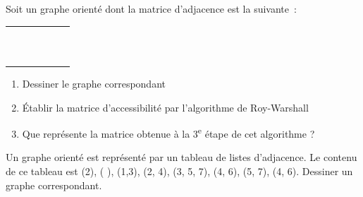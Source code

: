 	\begin{Exercice}{}
		Soit un graphe orienté dont la matrice d'adjacence est la suivante~:
				
		\begin{center}
			\tablefirsthead{}
			\tablehead{}
			\tabletail{}
			\tablelasttail{}
			\begin{supertabular}{m{0.93900007cm}|m{0.81600004cm}|m{0.81600004cm}|m{0.81600004cm}|m{0.81600004cm}|m{0.81600004cm}|}
			 &
			 &
			 &
			 &
			 &
			\\\hhline{~-----}
			 &
			 &
			 &
			 &
			 &
			\centering{}\\\hhline{~-----}
			 &
			 &
			 &
			 &
			 &
			\centering{}\\\hhline{~-----}
			 &
			 &
			 &
			 &
			 &
			\centering{}\\\hhline{~-----}
			 &
			 &
			 &
			 &
			 &
			\centering{}\\\hhline{~-----}
			 &
			 &
			 &
			 &
			 &
			\centering{}\\\hhline{~-----}
			\end{supertabular}
		\end{center}
		
		\begin{enumerate}
			\item {
				Dessiner le graphe correspondant}
			\item {
				Établir la matrice d'accessibilité par l'algorithme de Roy-Warshall}
			\item {
				Que représente la matrice obtenue à la 3\textsuperscript{e} étape de cet algorithme ?}
		\end{enumerate}
		
	\end{Exercice}
	
	\begin{Exercice}{}
		Un graphe orienté est représenté par un tableau de 
		listes d'adjacence. Le contenu de ce tableau est
		(2), ( ), (1,3), (2, 4), (3, 5, 7), (4, 6), (5, 7), (4, 6). 
		Dessiner un graphe correspondant.

	\end{Exercice}
	
